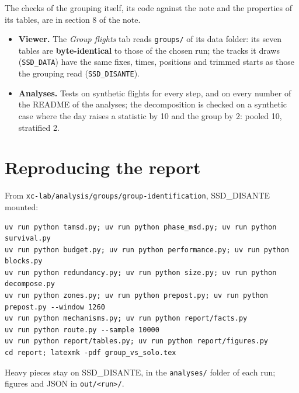 The checks of the grouping itself, its code against the note and the properties of its tables, are in
section 8 of the note.

\begin{itemize}
  \item \textbf{Viewer.} The \emph{Group flights} tab reads \texttt{groups/} of its data folder: its seven tables are \textbf{byte-identical} to those of the chosen run; the tracks it draws (\texttt{SSD\_DATA}) have the same fixes,
        times, positions and trimmed starts as those the grouping read (\texttt{SSD\_DISANTE}).
  \item \textbf{Analyses.} Tests on synthetic flights for every step, and on every number of the README of the analyses; the decomposition is checked on a synthetic case where the day raises
        a statistic by 10 and the group by 2: pooled 10, stratified 2.
\end{itemize}

\section{Reproducing the report}\label{app:reproduce}

From \texttt{xc-lab/analysis/groups/group-identification}, SSD\_DISANTE mounted:
\begin{verbatim}
uv run python tamsd.py; uv run python phase_msd.py; uv run python survival.py
uv run python budget.py; uv run python performance.py; uv run python blocks.py
uv run python redundancy.py; uv run python size.py; uv run python decompose.py
uv run python zones.py; uv run python prepost.py; uv run python prepost.py --window 1260
uv run python mechanisms.py; uv run python report/facts.py
uv run python route.py --sample 10000
uv run python report/tables.py; uv run python report/figures.py
cd report; latexmk -pdf group_vs_solo.tex
\end{verbatim}
Heavy pieces stay on SSD\_DISANTE, in the \texttt{analyses/} folder of each run; figures and JSON in \texttt{out/<run>/}.
